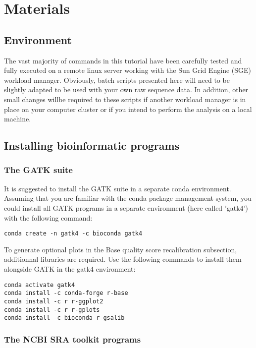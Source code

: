 \section{Materials}

\subsection{Environment}


The vast majority of commands in this tutorial have been carefully tested and fully executed on a remote linux server working with the Sun Grid Engine (SGE) workload manager. Obviously, batch scripts presented here will need to be slightly adapted to be used with your own raw sequence data. In addition, other small changes willbe required  to these scripts if another workload manager is in place on your computer cluster or if you intend to perform the analysis on a local machine.





\subsection{Installing bioinformatic programs}

\subsubsection{The GATK suite}

It is suggested to install the GATK suite in a separate conda environment. Assuming that you are familiar with the conda package management system, you could install all GATK programs in a separate environment (here called 'gatk4') with the following command:

\begin{verbatim}
conda create -n gatk4 -c bioconda gatk4 
\end{verbatim}

To generate optional plots in the Base quality score recalibration subsection, additionnal libraries are required. Use the following commands to install them alongside GATK in the gatk4 environment:

\begin{verbatim}
conda activate gatk4
conda install -c conda-forge r-base
conda install -c r r-ggplot2
conda install -c r r-gplots
conda install -c bioconda r-gsalib
\end{verbatim}


\subsubsection{The NCBI SRA toolkit programs}

